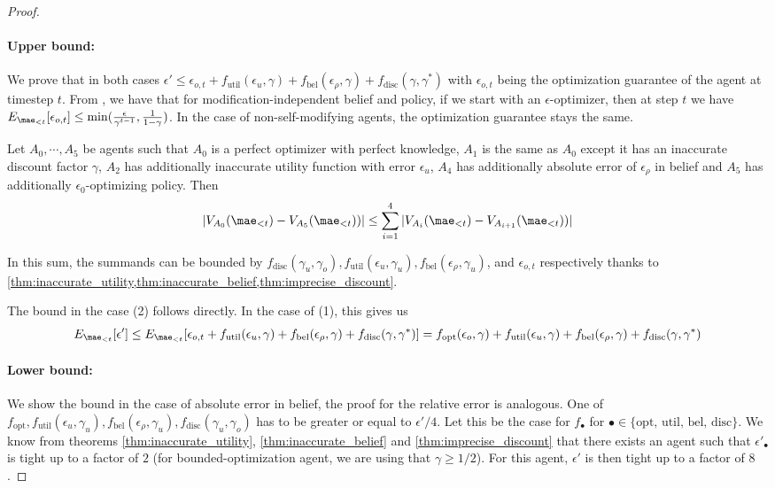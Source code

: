 \begin{proof}
\item
\paragraph{Upper bound:} We prove that in both cases $\epsilon' \leq \epsilon_{o,t} + f_\text{util}(\epsilon_u, \gamma) + f_\text{bel}(\epsilon_\rho, \gamma) + f_\text{disc}(\gamma, \gamma^*)$ with $\epsilon_{o,t}$ being the optimization guarantee of the agent at timestep $t$. From , we have that for modification-independent belief and policy, if we start with an $\epsilon$-optimizer, then at step $t$ we have $E_{\mae_{<t}}[\epsilon_{o,t}] \leq \min(\frac{\epsilon}{\gamma^{t-1}}, \frac{1}{1-\gamma})$. In the case of non-self-modifying agents, the optimization guarantee stays the same.

Let $A_0, \cdots, A_5$ be agents such that $A_0$ is a perfect optimizer with perfect knowledge, $A_1$ is the same as $A_0$ except it has an inaccurate discount factor $\gamma$, $A_2$ has additionally inaccurate utility function with error $\epsilon_u$, $A_4$ has additionally absolute error of $\epsilon_\rho$ in belief and $A_5$ has additionally $\epsilon_0$-optimizing policy. Then
\[
|V_{A_0}(\mae_{<t}) - V_{A_5}(\mae_{<t}))| \leq \sum_{i=1}^4 |V_{A_i}(\mae_{<t}) - V_{A_{i+1}}(\mae_{<t}))|
\]

In this sum, the summands can be bounded by $f_\text{disc}(\gamma_u, \gamma_o), f_\text{util}(\epsilon_u, \gamma_u), f_\text{bel}(\epsilon_\rho, \gamma_u)$, and $\epsilon_{o,t}$ respectively thanks to \cref{thm:inaccurate_utility,thm:inaccurate_belief,thm:imprecise_discount}.

The bound in the case (2) follows directly. In the case of (1), this gives us
\[
E_{\mae_{<t}}[\epsilon'] \leq E_{\mae_{<t}}[\epsilon_{o,t} + f_\text{util}(\epsilon_u, \gamma) + f_\text{bel}(\epsilon_\rho, \gamma) + f_\text{disc}(\gamma, \gamma^*)] = f_\text{opt}(\epsilon_o, \gamma) + f_\text{util}(\epsilon_u, \gamma) + f_\text{bel}(\epsilon_\rho, \gamma) + f_\text{disc}(\gamma, \gamma^*)
\]


\paragraph{Lower bound:} We show the bound in the case of absolute error in belief, the proof for the relative error is analogous. One of $f_\text{opt}, f_\text{util}(\epsilon_u, \gamma_u), f_\text{bel}(\epsilon_\rho, \gamma_u), f_\text{disc}(\gamma_u, \gamma_o)$ has to be greater or equal to $\epsilon'/4$. Let this be the case for $f_\bullet$ for $\bullet \in \{\text{opt, util, bel, disc}\}$. We know from theorems \ref{thm:inaccurate_utility}, \ref{thm:inaccurate_belief} and \ref{thm:imprecise_discount} that there exists an agent such that $\epsilon'_\bullet$ is tight up to a factor of $2$ (for bounded-optimization agent, we are using that $\gamma \geq 1/2$). For this agent, $\epsilon'$ is then tight up to a factor of $8$.
\end{proof}
